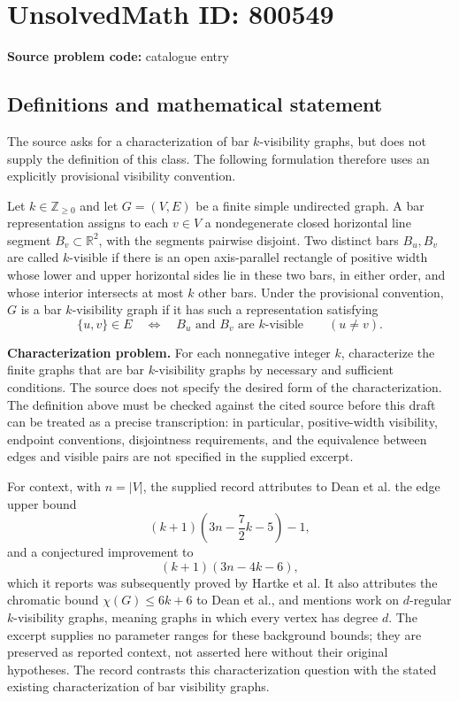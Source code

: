 \documentclass[11pt]{article}
\newcommand{\Z}{\mathbb{Z}}
\newcommand{\R}{\mathbb{R}}
\begin{document}
\section*{UnsolvedMath ID: 800549}
\textbf{Source problem code:} catalogue entry
\subsection{Definitions and mathematical statement}
The source asks for a characterization of bar $k$-visibility graphs, but does not supply the definition of this class. The following formulation therefore uses an explicitly provisional visibility convention.

Let $k\in\Z_{\geq 0}$ and let $G=(V,E)$ be a finite simple undirected graph. A bar representation assigns to each $v\in V$ a nondegenerate closed horizontal line segment $B_v\subset\R^2$, with the segments pairwise disjoint. Two distinct bars $B_u,B_v$ are called $k$-visible if there is an open axis-parallel rectangle of positive width whose lower and upper horizontal sides lie in these two bars, in either order, and whose interior intersects at most $k$ other bars. Under the provisional convention, $G$ is a bar $k$-visibility graph if it has such a representation satisfying
\[
\{u,v\}\in E
\quad\Longleftrightarrow\quad
B_u\text{ and }B_v\text{ are }k\text{-visible}
\qquad(u\ne v).
\]

\textbf{Characterization problem.} For each nonnegative integer $k$, characterize the finite graphs that are bar $k$-visibility graphs by necessary and sufficient conditions. The source does not specify the desired form of the characterization. The definition above must be checked against the cited source before this draft can be treated as a precise transcription: in particular, positive-width visibility, endpoint conventions, disjointness requirements, and the equivalence between edges and visible pairs are not specified in the supplied excerpt.

For context, with $n=|V|$, the supplied record attributes to Dean et al. the edge upper bound
\[
(k+1)\left(3n-\frac{7}{2}k-5\right)-1,
\]
and a conjectured improvement to
\[
(k+1)(3n-4k-6),
\]
which it reports was subsequently proved by Hartke et al. It also attributes the chromatic bound $\chi(G)\leq 6k+6$ to Dean et al., and mentions work on $d$-regular $k$-visibility graphs, meaning graphs in which every vertex has degree $d$. The excerpt supplies no parameter ranges for these background bounds; they are preserved as reported context, not asserted here without their original hypotheses. The record contrasts this characterization question with the stated existing characterization of bar visibility graphs.
\end{document}
